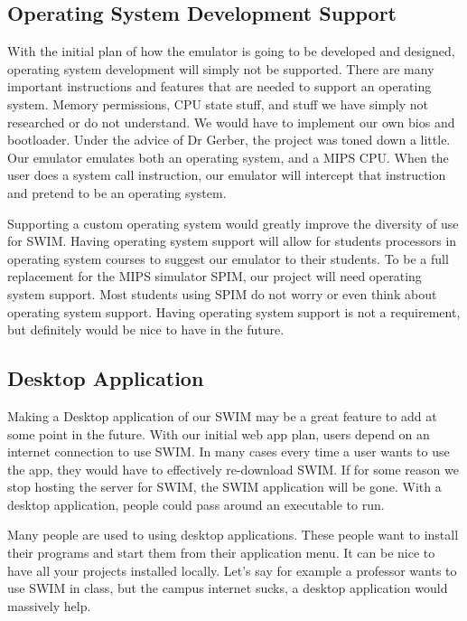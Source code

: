 \documentclass[
    paper=letter,
    parskip=half,
    fontsize=12pt,
    titlepage=firstiscover,
    toc=bibliography,
    numbers=endperiod
]{scrartcl}
\begin{document}
\subsection{Operating System Development Support}

With the initial plan of how the emulator is going to be developed and
designed, operating system development will simply not be supported.
There are many important instructions and features that are needed to
support an operating system. Memory permissions, CPU state stuff, and
stuff we have simply not researched or do not understand. We would have
to implement our own bios and bootloader. Under the advice of Dr Gerber,
the project was toned down a little. Our emulator emulates both an
operating system, and a MIPS CPU. When the user does a system call
instruction, our emulator will intercept that instruction and pretend to
be an operating system.

Supporting a custom operating system would greatly improve the diversity
of use for SWIM. Having operating system support will allow for students
processors in operating system courses to suggest our emulator to their
students. To be a full replacement for the MIPS simulator SPIM, our
project will need operating system support. Most students using SPIM do
not worry or even think about operating system support. Having operating
system support is not a requirement, but definitely would be nice to
have in the future.


\subsection{Desktop Application}

Making a Desktop application of our SWIM may be a great feature to add
at some point in the future. With our initial web app plan, users depend
on an internet connection to use SWIM. In many cases every time a user
wants to use the app, they would have to effectively re-download SWIM.
If for some reason we stop hosting the server for SWIM, the SWIM
application will be gone. With a desktop application, people could pass
around an executable to run.

Many people are used to using desktop applications. These people want to
install their programs and start them from their application menu. It
can be nice to have all your projects installed locally. Let's say for
example a professor wants to use SWIM in class, but the campus internet
sucks, a desktop application would massively help.
\end{document}
